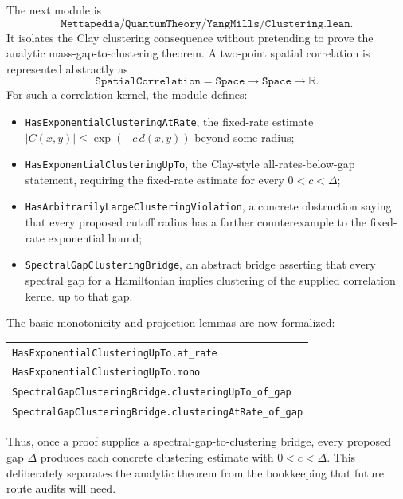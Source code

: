 \documentclass[11pt]{article}
\newcommand{\lean}[1]{\texttt{#1}}
\newcommand{\leansmall}[1]{{\small\texttt{#1}}}
\begin{document}
The next module is
\[
  \lean{Mettapedia/QuantumTheory/YangMills/Clustering.lean}.
\]
It isolates the Clay clustering consequence without pretending to prove the
analytic mass-gap-to-clustering theorem.  A two-point spatial correlation is
represented abstractly as
\[
  \lean{SpatialCorrelation}=\lean{Space}\to\lean{Space}\to\mathbb{R}.
\]
For such a correlation kernel, the module defines:
\begin{itemize}[leftmargin=1.5em]
  \item \lean{HasExponentialClusteringAtRate}, the fixed-rate estimate
    \(|C(x,y)|\le \exp(-c\,d(x,y))\) beyond some radius;
  \item \lean{HasExponentialClusteringUpTo}, the Clay-style all-rates-below-gap
    statement, requiring the fixed-rate estimate for every \(0<c<\Delta\);
  \item \lean{HasArbitrarilyLargeClusteringViolation}, a concrete obstruction
    saying that every proposed cutoff radius has a farther counterexample to
    the fixed-rate exponential bound;
  \item \lean{SpectralGapClusteringBridge}, an abstract bridge asserting that
    every spectral gap for a Hamiltonian implies clustering of the supplied
    correlation kernel up to that gap.
\end{itemize}

The basic monotonicity and projection lemmas are now formalized:
\begin{center}
\begin{tabular}{l}
\leansmall{HasExponentialClusteringUpTo.at\_rate}\\
\leansmall{HasExponentialClusteringUpTo.mono}\\
\leansmall{SpectralGapClusteringBridge.clusteringUpTo\_of\_gap}\\
\leansmall{SpectralGapClusteringBridge.clusteringAtRate\_of\_gap}
\end{tabular}
\end{center}
Thus, once a proof supplies a spectral-gap-to-clustering bridge, every proposed
gap \(\Delta\) produces each concrete clustering estimate with \(0<c<\Delta\).
This deliberately separates the analytic theorem from the bookkeeping that
future route audits will need.
\end{document}
